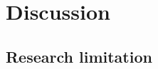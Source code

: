 \documentclass[english,12pt,a4paper,pdftex]{article}
\begin{document}

\clearpage

\section{Discussion}

\subsection{Research limitation}

\end{document}

